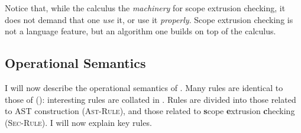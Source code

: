 Notice that, while the calculus the \textit{machinery} for scope extrusion checking, it does not demand that one \textit{use} it, or use it \textit{properly}. Scope extrusion checking is not a language feature, but an algorithm one builds on top of the calculus. 
\subsection{Operational Semantics}
I will now describe the operational semantics of \coreLang{}. Many rules are identical to those of \efflang{} (): interesting rules are collated in . Rules are divided into those related to AST construction (\textsc{Ast-Rule}), and those related to \textbf{s}cope \textbf{e}xtrusion \textbf{c}hecking (\textsc{Sec-Rule}). I will now explain key rules. 

\newcommand{\coreConfiguration}[5]{{#1}; {#2}; {#3}; {#4}; {#5}}
  \newcommand{\astRule}[1]{\rulename{Ast}{#1}}
  \newcommand{\secRule}[1]{\rulename{Sec}{#1}}


